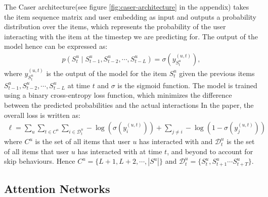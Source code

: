 \documentclass{ieeetj}
\begin{document}
The Caser architecture(see figure \ref{fig:caser-architecture} in the appendix) takes the item sequence matrix and user embedding as input and outputs a probability distribution over the items, which represents the probability of the user interacting with the item at the timestep we are predicting for. The output of the model hence can be expressed as:
\[
\begin{aligned}
	p(S_t^u \mid S_{t-1}^u, S_{t-2}^u, \cdots, S_{t-L}^u) = \sigma(y_{S_t^u}^{(u,t)}),
\end{aligned}
\]
where $y_{S_t^u}^{(u,t)}$ is the output of the model for the item $S_t^u$ given the previous items $S_{t-1}^u, S_{t-2}^u, \cdots, S_{t-L}^u$ at time $t$ and $\sigma$ is the sigmoid function. The model is trained using a binary cross-entropy loss function, which minimizes the difference between the predicted probabilities and the actual interactions In the paper, the overall loss is written as:
\[
\begin{aligned}
	\ell = \sum_u \sum_{t \in C^u} \sum_{i \in \mathcal{D}_t^u} -\log(\sigma(y_i^{(u,t)})) + \sum_{j \neq i} -\log(1 - \sigma(y_j^{(u,t)}))
\end{aligned}
\]
where $C^u$ is the set of all items that user $u$ has interacted with and $\mathcal{D}_t^u$ is the set of all items that user $u$ has interacted with at time $t$, and beyond to account for skip behaviours. Hence $C^u=\{L+1, L+2, \cdots, |S^u|\}$ and $\mathcal{D}_t^u = \{S^u_t , S^u_{t+1} \cdots S^u_{t+T}\}$.

\subsection{Attention Networks \cite{nais1}}
\end{document}
